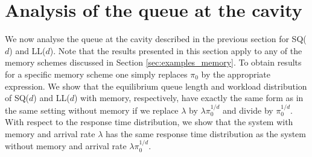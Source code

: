 \documentclass[12pt]{report}
\begin{document}


\section{Analysis of the queue at the cavity}\label{sec:analysis_memory}
We now analyse the queue at the cavity described in the previous section for SQ($d$) and LL($d$).
Note that the results presented in this section apply to any of the memory schemes discussed in
Section \ref{sec:examples_memory}. To obtain results for a specific memory scheme one simply replaces $\pi_0$
by the appropriate expression. We show that the equilibrium queue length and workload distribution
of SQ($d$) and LL($d$) with memory, respectively, have exactly the same form as in the same setting 
without memory if we replace $\lambda$ by $\lambda \pi_0^{1/d}$ and divide by $\pi_0^{1/d}$.
With respect to the response time distribution, we show that the system with memory 
and arrival rate $\lambda$ has the same response time distribution as the system without memory and arrival rate $\lambda \pi_0^{1/d}$.


\end{document}
